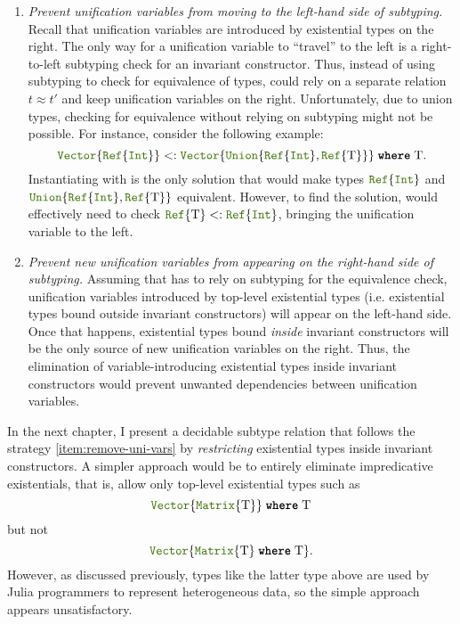 \begin{enumerate}
  \item\label{item:use-equality} 
    \emph{Prevent unification variables from moving to the left-hand side
    of subtyping.} Recall that unification variables are introduced by
    existential types on the right. The only way for a unification variable to
    ``travel'' to the left is a right-to-left subtyping check for an
    invariant constructor. Thus, instead of using subtyping to check for
    equivalence of types, \algo could rely on a separate relation
    $t \approx t'$ and keep unification variables on the right.
    Unfortunately, due to union types, checking for equivalence
    without relying on subtyping might not be possible.
    For instance, consider the following example:
    \[
      \vectyp{\reftyp{\inttyp}} 
      <: 
      \wheret{\vectyp{\uniontyp{\reftyp{\inttyp}, \reftyp{\T}}}}{\T}.
    \]
    Instantiating \T with \inttyp is the only solution that would make types
    $\reftyp{\inttyp}$ and $\uniontyp{\reftyp{\inttyp}, \reftyp{\T}}$
    equivalent. However, to find the solution, \algo would effectively need
    to check $\reftyp{\T} <: \reftyp{\inttyp}$, bringing the unification
    variable to the left.
  \item\label{item:remove-uni-vars} 
    \emph{Prevent new unification variables from appearing on the right-hand
    side of subtyping.} Assuming that \algo has to rely on subtyping 
    for the equivalence check, unification variables introduced by top-level
    existential types (i.e. existential types bound outside invariant
    constructors) will appear on the left-hand side. Once that happens,
    existential types bound \emph{inside} invariant constructors will be the
    only source of new unification variables on the right.
    Thus, the elimination of variable-introducing existential types inside 
    invariant constructors would prevent unwanted
    dependencies between unification variables.
\end{enumerate}

In the next chapter, I present a decidable subtype relation that
follows the strategy \ref{item:remove-uni-vars} by \emph{restricting}
existential types inside invariant constructors.
A simpler approach would be to entirely eliminate impredicative existentials,
that is, allow only top-level existential types such as
\[ \wheret{\vectyp{\mattyp{\T}}}{\T} \]
but not
\[ \vectyp{\wheret{\mattyp{\T}}{\T}}. \]
However, as discussed previously, %
types like the latter  type above are used by Julia programmers 
to represent heterogeneous data, so the simple approach appears unsatisfactory.
